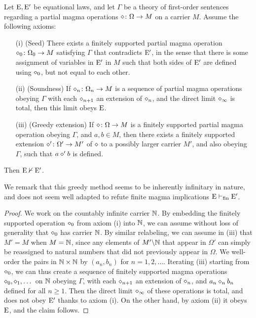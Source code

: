 \begin{theorem}\label{greedy-abstract} Let $\mathrm{E},{\mathrm{E}'}$ be equational laws, and let $\Gamma$ be a theory of first-order sentences regarding a  partial magma operations $\diamond \colon \Omega \to M$ on a carrier $M$.  Assume the following axioms:
\begin{itemize}
  \item[(i)] (Seed) There exists a finitely supported partial magma operation $\diamond_0 \colon \Omega_0 \to M$ satisfying $\Gamma$ that contradicts ${\mathrm{E}'}$, in the sense that there is some assignment of variables in ${\mathrm{E}'}$ in $M$ such that both sides of ${\mathrm{E}'}$ are defined using $\diamond_0$, but not equal to each other.
  \item[(ii)]  (Soundness)  If $\diamond_n \colon \Omega_n \to M$ is a sequence of partial magma operations obeying $\Gamma$ with each $\diamond_{n+1}$ an extension of $\diamond_n$, and the direct limit $\diamond_\infty$ is total, then this limit obeys $\mathrm{E}$.
  \item[(iii)] (Greedy extension)  If $\diamond \colon \Omega \to M$ is a finitely supported partial magma operation obeying $\Gamma$, and $a,b \in M$, then there exists a finitely supported extension $\diamond' \colon \Omega' \to M'$ of $\diamond$ to a possibly larger carrier $M'$, and also obeying $\Gamma$, such that $a \diamond' b$ is defined.
\end{itemize}
Then $\mathrm{E} \nvdash {\mathrm{E}'}$.
\end{theorem}

We remark that this greedy method seems to be inherently infinitary in nature, and does not seem well adapted to refute finite magma implications $\mathrm{E} \vdash_{\mathrm{fin}} {\mathrm{E}'}$.

\begin{proof}  We work on the countably infinite carrier $\mathbb{N}$.  By embedding the finitely supported operation $\diamond_0$ from axiom (i) into $\mathbb{N}$, we can assume without loss of generality that $\diamond_0$ has carrier $\mathbb{N}$.  By similar relabeling, we can assume in (iii) that $M' = M$ when $M=\mathbb{N}$, since any elements of $M' \backslash \mathbb{N}$ that
appear in $\Omega'$ can simply be reassigned to natural numbers that did not previously appear in $\Omega$.  We well-order the pairs in $\mathbb{N} \times \mathbb{N}$ by $(a_n,b_n)$ for $n=1,2,\dots$.  Iterating (iii) starting from $\diamond_0$, we can thus create a sequence of finitely supported magma operations $\diamond_0, \diamond_1, \dots$ on $\mathbb{N}$ obeying $\Gamma$, with each $\diamond_{n+1}$ an extension of $\diamond_n$, and $a_n \diamond_n b_n$ defined for all $n \geq 1$.  Then the direct limit $\diamond_\infty$ of these operations is total, and does not obey ${\mathrm{E}'}$ thanks to axiom (i).  On the other hand, by axiom (ii) it obeys $\mathrm{E}$, and the claim follows.
\end{proof}

